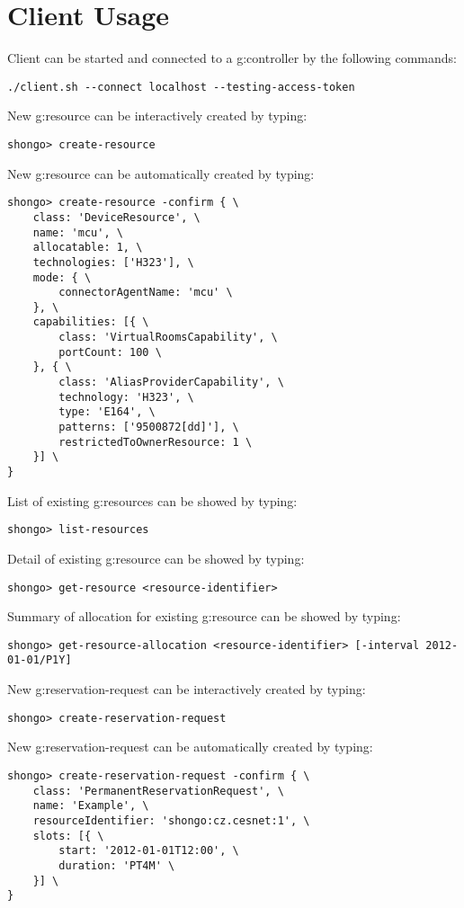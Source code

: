 \appendix



\chapter{Client Usage}

Client can be started and connected to a \gls{g:controller} by the following commands:
\begin{verbatim}
./client.sh --connect localhost --testing-access-token
\end{verbatim}
New \gls{g:resource} can be interactively created by typing:
\begin{verbatim}
shongo> create-resource
\end{verbatim}
New \gls{g:resource} can be automatically created by typing:
\begin{verbatim}
shongo> create-resource -confirm { \
    class: 'DeviceResource', \
    name: 'mcu', \
    allocatable: 1, \
    technologies: ['H323'], \
    mode: { \
        connectorAgentName: 'mcu' \
    }, \
    capabilities: [{ \
        class: 'VirtualRoomsCapability', \
        portCount: 100 \
    }, { \
        class: 'AliasProviderCapability', \
        technology: 'H323', \
        type: 'E164', \
        patterns: ['9500872[dd]'], \
        restrictedToOwnerResource: 1 \
    }] \
}
\end{verbatim}
List of existing \glspl{g:resource} can be showed by typing:
\begin{verbatim}
shongo> list-resources
\end{verbatim}
Detail of existing \gls{g:resource} can be showed by typing:
\begin{verbatim}
shongo> get-resource <resource-identifier>
\end{verbatim}
Summary of allocation for existing \gls{g:resource} can be showed by typing:
\begin{verbatim}
shongo> get-resource-allocation <resource-identifier> [-interval 2012-01-01/P1Y]
\end{verbatim}
New \gls{g:reservation-request} can be interactively created by typing:
\begin{verbatim}
shongo> create-reservation-request
\end{verbatim}
New \gls{g:reservation-request} can be automatically created by typing:
\begin{verbatim}
shongo> create-reservation-request -confirm { \
    class: 'PermanentReservationRequest', \
    name: 'Example', \
    resourceIdentifier: 'shongo:cz.cesnet:1', \
    slots: [{ \
        start: '2012-01-01T12:00', \
        duration: 'PT4M' \
    }] \
}
\end{verbatim}
